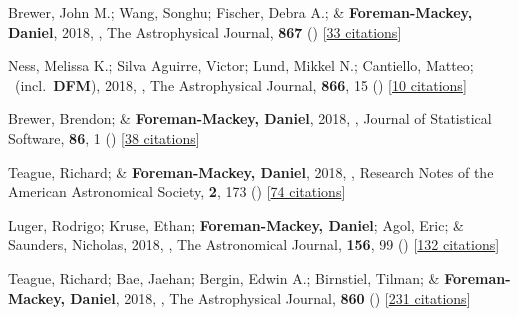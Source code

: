 \item[{\color{numcolor}\scriptsize40}] Brewer, John M.; Wang, Songhu; Fischer, Debra A.; \& \textbf{Foreman-Mackey, Daniel}, 2018, , The Astrophysical Journal, \textbf{867} () [\href{https://ui.adsabs.harvard.edu/abs/2018ApJ...867L...3B}{33 citations}]

\item[{\color{numcolor}\scriptsize39}] Ness, Melissa K.; Silva Aguirre, Victor; Lund, Mikkel N.; Cantiello, Matteo; \etal\ (incl.\ \textbf{DFM}), 2018, , The Astrophysical Journal, \textbf{866}, 15 () [\href{https://ui.adsabs.harvard.edu/abs/2018ApJ...866...15N}{10 citations}]

\item[{\color{numcolor}\scriptsize38}] Brewer, Brendon; \& \textbf{Foreman-Mackey, Daniel}, 2018, , Journal of Statistical Software, \textbf{86}, 1 () [\href{https://scholar.google.com/scholar?cites=789224875040810871}{38 citations}]

\item[{\color{numcolor}\scriptsize37}] Teague, Richard; \& \textbf{Foreman-Mackey, Daniel}, 2018, , Research Notes of the American Astronomical Society, \textbf{2}, 173 () [\href{https://ui.adsabs.harvard.edu/abs/2018RNAAS...2..173T}{74 citations}]

\item[{\color{numcolor}\scriptsize36}] Luger, Rodrigo; Kruse, Ethan; \textbf{Foreman-Mackey, Daniel}; Agol, Eric; \& Saunders, Nicholas, 2018, , The Astronomical Journal, \textbf{156}, 99 () [\href{https://ui.adsabs.harvard.edu/abs/2018AJ....156...99L}{132 citations}]

\item[{\color{numcolor}\scriptsize35}] Teague, Richard; Bae, Jaehan; Bergin, Edwin A.; Birnstiel, Tilman; \& \textbf{Foreman-Mackey, Daniel}, 2018, , The Astrophysical Journal, \textbf{860} () [\href{https://ui.adsabs.harvard.edu/abs/2018ApJ...860L..12T}{231 citations}]

